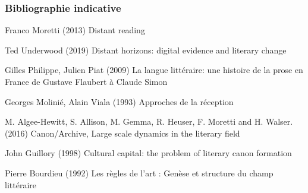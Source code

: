 \documentclass{beamer}
\begin{document}

\begin{frame}
\frametitle{Bibliographie indicative}
\footnotesize{
\begin{thebibliography}{99}

 Franco Moretti (2013)
\newblock Distant reading

 Ted Underwood (2019)
\newblock Distant horizons: digital evidence and literary change

 Gilles Philippe, Julien Piat (2009)
\newblock La langue littéraire: une histoire de la prose en France de Gustave Flaubert à Claude Simon

 Georges Molinié, Alain Viala (1993)
\newblock Approches de la réception

 M. Algee-Hewitt, S. Allison, M. Gemma, R. Heuser, F. Moretti and H. Walser. (2016)
\newblock Canon/Archive, Large scale dynamics in the literary field

 John Guillory (1998)
\newblock Cultural capital: the problem of literary canon formation

 Pierre Bourdieu (1992)
\newblock Les règles de l'art : Genèse et structure du champ littéraire

\end{thebibliography}

}
\end{frame}

\end{document}
